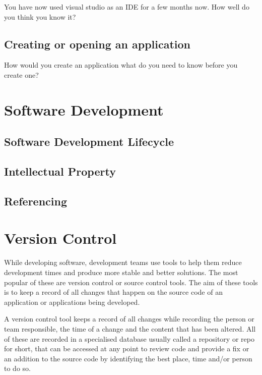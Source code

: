 \documentclass[
]{book}
\begin{document}
You have now used visual studio as an IDE for a few months now. How well do you think you know it?

\hypertarget{creating-or-opening-an-application}{%
\subsection{Creating or opening an application}\label{creating-or-opening-an-application}}

How would you create an application what do you need to know before you create one?

\hypertarget{software-development}{%
\section{Software Development}\label{software-development}}

\hypertarget{software-development-lifecycle}{%
\subsection{Software Development Lifecycle}\label{software-development-lifecycle}}

\hypertarget{intellectual-property}{%
\subsection{Intellectual Property}\label{intellectual-property}}

\hypertarget{referencing}{%
\subsection{Referencing}\label{referencing}}

\hypertarget{version-control}{%
\section{Version Control}\label{version-control}}

While developing software, development teams use tools to help them reduce development times and produce more stable and better solutions.
The most popular of these are version control or source control tools. The aim of these tools is to keep a record of all changes that happen on the source code of an application or applications being developed.

A version control tool keeps a record of all changes while recording the person or team responsible, the time of a change and the content that has been altered. All of these are recorded in a specialised database usually called a repository or repo for short, that can be accessed at any point to review code and provide a fix or an addition to the source code by identifying the best place, time and/or person to do so.
\end{document}
